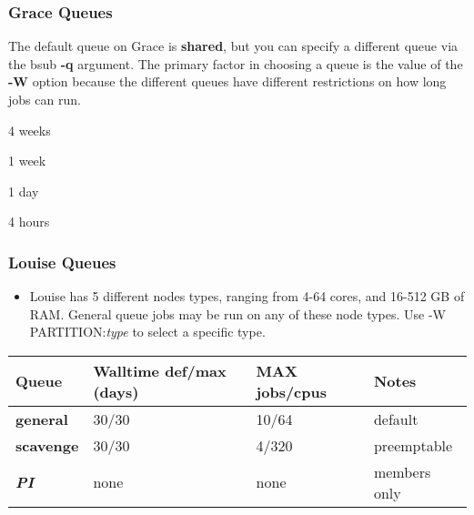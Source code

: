 \documentclass[10pt]{beamer}
\begin{document}
\begin{frame}
\frametitle{Grace Queues}
The default queue on Grace is \textbf{shared}, but you can specify
a different queue via the bsub \textbf{-q} argument.
The primary factor in choosing a queue is the value of the \textbf{-W}
option because the different queues have different restrictions on how
long jobs can run.

\vskip10pt
\begin{description}[interactive]
\item[long]                  4 weeks
\item[week]                  1 week
\item[shared]                1 day
\item[interactive]           4 hours
\end{description}

\end{frame}

\begin{frame}
\frametitle{Louise Queues}

\begin{itemize}
\item Louise has 5 different nodes types, ranging from 4-64 cores, and 16-512 GB of RAM.  General queue jobs may be run on any
of these node types.  Use -W PARTITION:\textit{type} to select a specific type. 
\end{itemize}

\begin{tabular}{|l|l|l|l|}
\hline
\textbf{Queue} & \textbf{Walltime def/max (days)}& \textbf{MAX jobs/cpus} & \textbf{Notes} \\
\hline
\textbf{general} & 30/30 &  10/64 & default \\
\hline
\textbf{scavenge} & 30/30 &  4/320 & preemptable \\
\hline
\textbf{\textit{PI}} & none & none & members only \\
\hline
\end{tabular}

\end{frame}
\end{document}
